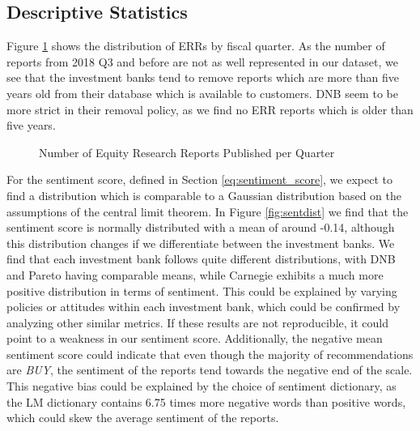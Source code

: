 \subsection{Descriptive Statistics} \label{sec:descriptive}

Figure \ref{fig:reportspub} shows the distribution of ERRs by fiscal quarter. As the number of reports from 2018 Q3 and before are not as well represented in our dataset, we see that the investment banks tend to remove reports which are more than five years old from their database which is available to customers. DNB seem to be more strict in their removal policy, as we find no ERR reports which is older than five years.

\begin{figure}[H]
        \centering
        
        \caption{Number of Equity Research Reports Published per Quarter}
        \label{fig:reportspub}
    \end{figure}
    
For the sentiment score, defined in Section \ref{eq:sentiment_score}, we expect to find a distribution which is comparable to a Gaussian distribution based on the assumptions of the central limit theorem. In Figure \ref{fig:sentdist} we find that the sentiment score is normally distributed with a mean of around -0.14, although this distribution changes if we differentiate between the investment banks. We find that each investment bank follows quite different distributions, with DNB and Pareto having comparable means, while Carnegie exhibits a much more positive distribution in terms of sentiment. This could be explained by varying policies or attitudes within each investment bank, which could be confirmed by analyzing other similar metrics. If these results are not reproducible, it could point to a weakness in our sentiment score. Additionally, the negative mean sentiment score could indicate that even though the majority of recommendations are \textit{BUY}, the sentiment of the reports tend towards the negative end of the scale. This negative bias could be explained by the choice of sentiment dictionary, as the LM dictionary contains 6.75 times more negative words than positive words, which could skew the average sentiment of the reports.

